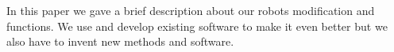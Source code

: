 In this paper we gave a brief description about our robots modification and functions. We use and
develop existing software to make it even better but we also have to invent new methods and
software.